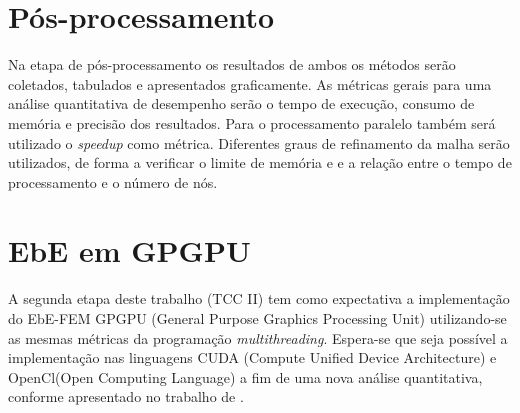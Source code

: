 	\section{Pós-processamento}
	Na etapa de pós-processamento os resultados de ambos os métodos serão coletados, tabulados e apresentados graficamente. As métricas gerais para uma análise quantitativa de desempenho serão o tempo de execução, consumo de memória e precisão dos resultados.
	Para o processamento paralelo também será utilizado o \textit{speedup} como métrica. 
	 Diferentes graus de refinamento da malha serão utilizados, de forma a verificar o limite de memória e e a relação entre o tempo de processamento e o número de nós.
	 
	\section{EbE em GPGPU}	
	 A segunda etapa deste trabalho (TCC II) tem como expectativa a implementação do EbE-FEM GPGPU (General Purpose Graphics Processing Unit) utilizando-se as mesmas métricas da programação \textit{multithreading}. Espera-se que seja possível a implementação nas linguagens CUDA (Compute Unified Device Architecture) e OpenCl(Open Computing Language) a fim de uma nova análise quantitativa, conforme apresentado no trabalho de .
